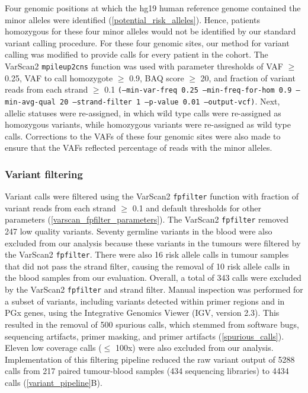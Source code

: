 \documentclass{bmcart}
\begin{document}
Four genomic positions at which the hg19 human reference genome contained the minor alleles were identified (\autoref{potential_risk_alleles}). Hence, patients homozygous for these four minor alleles would not be identified by our standard variant calling procedure. For these four genomic sites, our method for variant calling was modified to provide calls for every patient in the cohort. The VarScan2 \texttt{mpileup2cns} function was used with parameter thresholds of VAF $\geq$ 0.25, VAF to call homozygote $\geq$ 0.9, BAQ score $\geq$ 20, and fraction of variant reads from each strand $\geq$ 0.1 \texttt{(--min-var-freq 0.25 --min-freq-for-hom 0.9 --min-avg-qual 20 --strand-filter 1 --p-value 0.01 --output-vcf)}. Next, allelic statuses were re-assigned, in which wild type calls were re-assigned as homozygous variants, while homozygous variants were re-assigned as wild type calls. Corrections to the VAFs of these four genomic sites were also made to ensure that the VAFs reflected percentage of reads with the minor alleles.

\subsubsection*{Variant filtering}

Variant calls were filtered using the VarScan2 \texttt{fpfilter} function with fraction of variant reads from each strand $\geq$ 0.1 and default thresholds for other parameters (\autoref{varscan_fpfilter_parameters}). The VarScan2 \texttt{fpfilter} removed 247 low quality variants. Seventy germline variants in the blood were also excluded from our analysis because these variants in the tumours were filtered by the VarScan2 \texttt{fpfilter}. There were also 16 risk allele calls in tumour samples that did not pass the strand filter, causing the removal of 10 risk allele calls in the blood samples from our evaluation. Overall, a total of 343 calls were excluded by the VarScan2 \texttt{fpfilter} and strand filter. Manual inspection was performed for a subset of variants, including variants detected within primer regions and in PGx genes, using the Integrative Genomics Viewer (IGV, version 2.3). This resulted in the removal of 500 spurious calls, which stemmed from software bugs, sequencing artifacts, primer masking, and primer artifacts (\autoref{spurious_calls}). Eleven low coverage calls ($\leq$ 100x) were also excluded from our analysis. Implementation of this filtering pipeline reduced the raw variant output of 5288 calls from 217 paired tumour-blood samples (434 sequencing libraries) to 4434 calls (\autoref{variant_pipeline}B).
\end{document}
